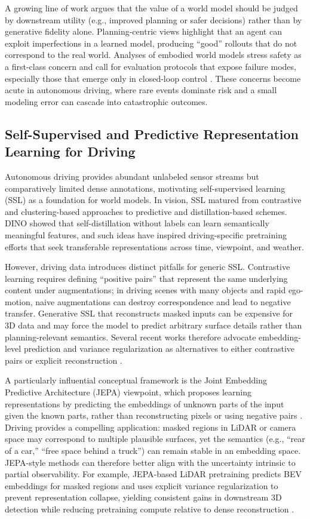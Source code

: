 A growing line of work argues that the value of a world model should be judged by downstream utility (e.g., improved planning or safer decisions) rather than by generative fidelity alone. Planning-centric views highlight that an agent can exploit imperfections in a learned model, producing “good” rollouts that do not correspond to the real world. Analyses of embodied world models stress safety as a first-class concern and call for evaluation protocols that expose failure modes, especially those that emerge only in closed-loop control \cite{Baraldi2025}. These concerns become acute in autonomous driving, where rare events dominate risk and a small modeling error can cascade into catastrophic outcomes.

\subsection{Self-Supervised and Predictive Representation Learning for Driving}

Autonomous driving provides abundant unlabeled sensor streams but comparatively limited dense annotations, motivating self-supervised learning (SSL) as a foundation for world models. In vision, SSL matured from contrastive and clustering-based approaches to predictive and distillation-based schemes. DINO \cite{Caron2021} showed that self-distillation without labels can learn semantically meaningful features, and such ideas have inspired driving-specific pretraining efforts that seek transferable representations across time, viewpoint, and weather.

However, driving data introduces distinct pitfalls for generic SSL. Contrastive learning requires defining “positive pairs” that represent the same underlying content under augmentations; in driving scenes with many objects and rapid ego-motion, naive augmentations can destroy correspondence and lead to negative transfer. Generative SSL that reconstructs masked inputs can be expensive for 3D data and may force the model to predict arbitrary surface details rather than planning-relevant semantics. Several recent works therefore advocate embedding-level prediction and variance regularization as alternatives to either contrastive pairs or explicit reconstruction \cite{Minh2022,Min2024,Zhu2025}.

A particularly influential conceptual framework is the Joint Embedding Predictive Architecture (JEPA) viewpoint, which proposes learning representations by predicting the embeddings of unknown parts of the input given the known parts, rather than reconstructing pixels or using negative pairs \cite{LeCun2022}. Driving provides a compelling application: masked regions in LiDAR or camera space may correspond to multiple plausible surfaces, yet the semantics (e.g., “rear of a car,” “free space behind a truck”) can remain stable in an embedding space. JEPA-style methods can therefore better align with the uncertainty intrinsic to partial observability. For example, JEPA-based LiDAR pretraining predicts BEV embeddings for masked regions and uses explicit variance regularization to prevent representation collapse, yielding consistent gains in downstream 3D detection while reducing pretraining compute relative to dense reconstruction \cite{Zhu2025}.

